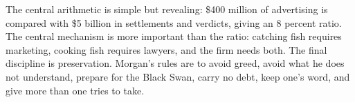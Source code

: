 The central arithmetic is simple but revealing: \$400 million of advertising is compared with \$5 billion in settlements and verdicts, giving an 8 percent ratio. The central mechanism is more important than the ratio: catching fish requires marketing, cooking fish requires lawyers, and the firm needs both. The final discipline is preservation. Morgan's rules are to avoid greed, avoid what he does not understand, prepare for the Black Swan, carry no debt, keep one's word, and give more than one tries to take.